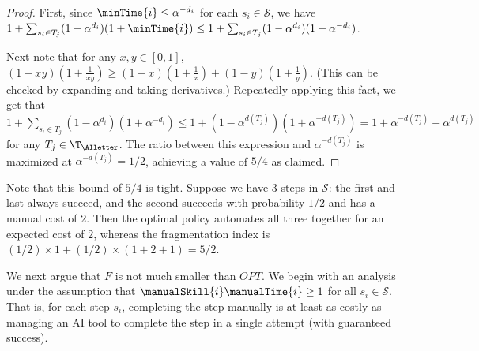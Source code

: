 \begin{proof}
First, since $\minTime{i} \leq \alpha^{-d_i}$ for each $s_i \in \mathcal{S}$, we have 
$1 + \sum_{s_i \in T_j}(1-\alpha^{d_i})(1+\minTime{i}) \leq 1 + \sum_{s_i \in T_j}(1-\alpha^{d_i})(1+\alpha^{-d_i})$.

Next note that for any $x,y\in [0,1]$, $(1-xy)(1+\tfrac{1}{xy}) \geq (1-x)(1+\tfrac{1}{x}) + (1-y)(1+\tfrac{1}{y})$.  
(This can be checked by expanding and taking derivatives.)  
Repeatedly applying this fact, we get that $1 + \sum_{s_i \in T_j}(1-\alpha^{d_i})(1+\alpha^{-d_i}) \leq 1 + (1-\alpha^{d(T_j)})(1+\alpha^{-d(T_j)}) = 1 + \alpha^{-d(T_j)} - \alpha^{d(T_j)}$ for any $T_j \in \T_{\AIletter}$.  
The ratio between this expression and $\alpha^{-d(T_j)}$ is maximized at $\alpha^{-d(T_j)} = 1/2$, achieving a value of $5/4$ as claimed.
\end{proof}

Note that this bound of $5/4$ is tight.  
Suppose we have 3 steps in $\mathcal{S}$: the first and last always succeed, and the second succeeds with probability $1/2$ and has a manual cost of $2$.
Then the optimal policy automates all three together for an expected cost of $2$, whereas the fragmentation index is $(1/2)\times 1 + (1/2) \times (1+2+1) = 5/2$.

\medskip

We next argue that $F$ is not much smaller than $OPT$.  
We begin with an analysis under the assumption that $\manualSkill{i}\manualTime{i} \geq 1$ for all $s_i \in \mathcal{S}$.  
That is, for each step $s_i$, completing the step manually is at least as costly as managing an AI tool to complete the step in a single attempt (with guaranteed success).

